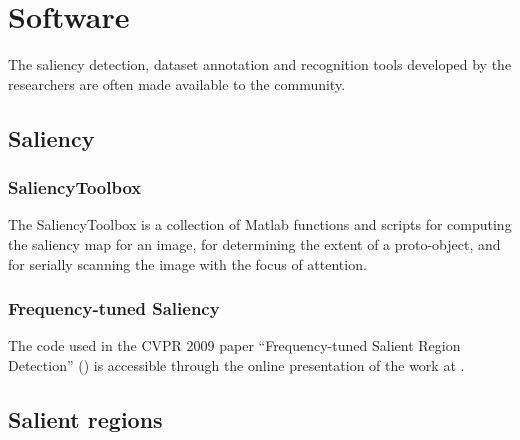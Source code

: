 \section{Software}
\label{sec:soft}

The saliency detection, dataset annotation and recognition tools developed by the researchers are often made available to the community.

\subsection{Saliency}
\subsubsection{SaliencyToolbox}\label{subsec:saltool}
The SaliencyToolbox is a collection of Matlab functions and scripts for computing the saliency map for an image, for determining the extent of a proto-object, and for serially scanning the image with the focus of attention. 

\subsubsection{Frequency-tuned Saliency}
The code used in the CVPR 2009 paper ``Frequency-tuned Salient Region Detection'' (\cite{LCAV-CONF-2009-012}) is accessible through the online presentation of the work at \cite{achantaCVPR09}.


\subsection{Salient regions}\label{soft:salreg:sec}

